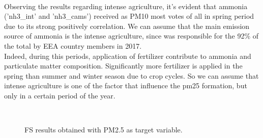 \\
Observing the results regarding intense agriculture, it's evident that ammonia ('nh3\_int' and 'nh3\_cams') received as PM10 most votes of all in spring period due to its strong positively correlation. 
We can assume that the main emission source of ammonia is the intense agriculture, since was responsible for the 92\% of the total by EEA country members in 2017\cite{maranzano2022air}.\\
Indeed, during this periods, application of fertilizer contribute to ammonia and particulate matter composition.
Significantly more fertilizer is applied in the spring than summer and winter season due to crop cycles\cite{goebes2003ammonia}.
So we can assume that intense agriculture is one of the factor that influence the pm25 formation, but only in a certain period of the year.\\
\pagebreak
\clearpage
\begin{figure}[H]
\centering
{}\\
\caption{FS results obtained with PM2.5 as target variable.}
\label{fig:fs_pm25}
\end{figure}
